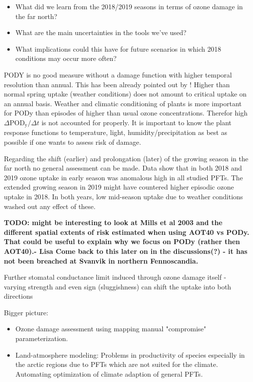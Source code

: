 \documentclass[bg, manuscript]{copernicus}
\begin{document}
\label{sec:conc} 
\begin{itemize}
  \item What did we learn from the 2018/2019 seasons in terms of ozone damage in the far north?
  \item What are the main uncertainties in the tools we've used?
  \item What implications could this have for future scenarios in which 2018 conditions may occur more often?
\end{itemize}
PODY is no good measure without a damage function with higher temporal resolution than annual. This has been already pointed out by \citet{AE:Musselman2006}! Higher than normal spring uptake (weather conditions) does not amount to critical uptake on an annual basis. 
Weather and climatic conditioning of plants is more important for PODy than episodes of higher than usual ozone concentrations. Therefor high $\Delta \mathrm{POD_y} / \Delta t$ is not accounted for properly.
It is important to know the plant response functions to temperature, light, humidity/precipitation as best as possible if one wants to assess risk of damage.

Regarding the shift (earlier) and prolongation (later) of the growing season in the far north no general assessment can be made. Data show that in both 2018 and 2019 ozone uptake in early season was anomalous high in all studied PFTs. The extended growing season in 2019 might have countered higher episodic ozone uptake in 2018. In both years, low mid-season uptake due to weather conditions washed out any effect of these.

{\bf TODO: might be interesting to look at Mills et al 2003 and the different spatial extents of risk estimated when using AOT40 vs PODy. That could be useful to explain why we focus on PODy (rather then AOT40).- Lisa Come back to this later on in the discussions(?) - it has not been breached at Svanvik in northern Fennoscandia.}

Further stomatal conductance limit induced through ozone damage itself - varying strength and even sign (sluggishness) can shift the uptake into both directions

Bigger picture:
\begin{itemize}
\item Ozone damage assessment using mapping manual "compromise" parameterization.
\item Land-atmosphere modeling: Problems in productivity of species especially in the arctic regions due to PFTs which are not suited for the climate. Automating optimization of climate adaption of general PFTs.
\end{itemize}
\end{document}
